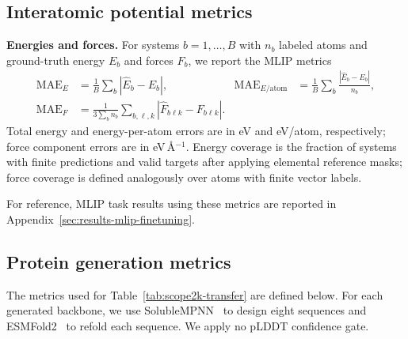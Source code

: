 \documentclass{article} %
\begin{document}
\subsection{Interatomic potential metrics}
\label{app:metrics-mlip}

\textbf{Energies and forces.} For systems $b=1,\ldots,B$ with $n_b$ labeled atoms and ground-truth energy $E_b$ and forces $F_b$, we report the MLIP metrics
\begin{align}
  \mathrm{MAE}_E
  &= \frac{1}{B}\sum_b |\widehat E_b-E_b|, &
  \mathrm{MAE}_{E/\text{atom}}
  &= \frac{1}{B}\sum_b
     \frac{|\widehat E_b-E_b|}{n_b}, \\
  \mathrm{MAE}_F
  &= \frac{1}{3\sum_b n_b}
     \sum_{b,\ell,k}
     |\widehat F_{b\ell k}-F_{b\ell k}|.
  \label{eq:mlip-metrics}
\end{align}
Total energy and energy-per-atom errors are in eV and eV/atom, respectively; force component errors are in eV\,\AA$^{-1}$. Energy coverage is the fraction of systems with finite predictions and valid targets after applying elemental reference masks; force coverage is defined analogously over atoms with finite vector labels.

For reference, MLIP task results using these metrics are reported in Appendix~\ref{sec:results-mlip-finetuning}.

\subsection{Protein generation metrics}
\label{app:metrics-protein}

The metrics used for Table~\ref{tab:scope2k-transfer} are defined below. For
each generated backbone, we use
SolubleMPNN~\citep{dauparas2022proteinmpnn} to design eight sequences and
ESMFold2~\citep{candido2026esmfold2} to refold each sequence. We apply no
pLDDT confidence gate.
\end{document}
